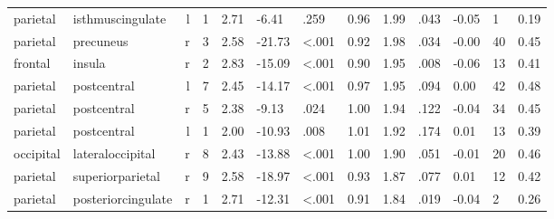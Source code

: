 \documentclass{article}
\begin{document}
\begin{longtable}{llrR{1.3cm}R{1cm}R{1.3cm}R{1cm}R{1cm}R{1.3cm}R{1cm}R{1.8cm}R{1.3cm}R{1.8cm}}
  parietal &          isthmuscingulate &    l &         1 &                  2.71 &            -6.41 &               .259 &                               0.96 &                          1.99 &                            .043 &  -0.05 &      1 &      0.19 \\
  parietal &                 precuneus &    r &         3 &                  2.58 &           -21.73 &      \textless.001 &                               0.92 &                          1.98 &                            .034 &  -0.00 &     40 &      0.45 \\
   frontal &                    insula &    r &         2 &                  2.83 &           -15.09 &      \textless.001 &                               0.90 &                          1.95 &                            .008 &  -0.06 &     13 &      0.41 \\
  parietal &               postcentral &    l &         7 &                  2.45 &           -14.17 &      \textless.001 &                               0.97 &                          1.95 &                            .094 &   0.00 &     42 &      0.48 \\
  parietal &               postcentral &    r &         5 &                  2.38 &            -9.13 &               .024 &                               1.00 &                          1.94 &                            .122 &  -0.04 &     34 &      0.45 \\
  parietal &               postcentral &    l &         1 &                  2.00 &           -10.93 &               .008 &                               1.01 &                          1.92 &                            .174 &   0.01 &     13 &      0.39 \\
 occipital &          lateraloccipital &    r &         8 &                  2.43 &           -13.88 &      \textless.001 &                               1.00 &                          1.90 &                            .051 &  -0.01 &     20 &      0.46 \\
  parietal &          superiorparietal &    r &         9 &                  2.58 &           -18.97 &      \textless.001 &                               0.93 &                          1.87 &                            .077 &   0.01 &     12 &      0.42 \\
  parietal &        posteriorcingulate &    r &         1 &                  2.71 &           -12.31 &      \textless.001 &                               0.91 &                          1.84 &                            .019 &  -0.04 &      2 &      0.26 \\

\end{longtable}
\end{document}
